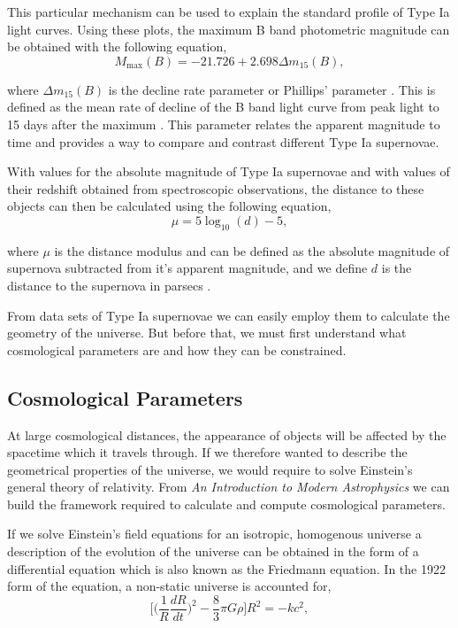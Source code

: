 \documentclass[twocolumn]{revtex4}
\begin{document}
This particular mechanism can be used to explain the standard profile of Type Ia light curves. Using these plots, the maximum B band photometric magnitude can be obtained with the following equation,
\begin{equation}
M_{\max}(B)=-21.726+2.698\Delta m_{15}(B),
\end{equation}

where $\Delta m_{15}(B)$ is the decline rate parameter or Phillips' parameter \cite{high_en_astro}. This is defined as the mean rate of decline of the B band light curve from peak light to 15 days after the maximum \cite{abs_phil}. This parameter relates the apparent magnitude to time and provides a way to compare and contrast different Type Ia supernovae. 

With values for the absolute magnitude of Type Ia supernovae and with values of their redshift obtained from spectroscopic observations, the distance to these objects can then be calculated using the following equation, 
\begin{equation}
\mu = 5 \log_{10}(d) - 5,
\end{equation}

where $\mu$ is the distance modulus and can be defined as the absolute magnitude of supernova subtracted from it's apparent magnitude, and we define $d$ is the distance to the supernova in parsecs \cite{mod_ast}. 

From data sets of Type Ia supernovae we can easily employ them to calculate the geometry of the universe. But before that, we must first understand what cosmological parameters are and how they can be constrained.

\vspace{-3ex}
\subsection{Cosmological Parameters}
\vspace{-2ex}
At large cosmological distances, the appearance of objects will be affected by the spacetime which it travels through. If we therefore wanted to describe the geometrical properties of the universe, we would require to solve Einstein's general theory of relativity. From \textit{An Introduction to Modern Astrophysics} \cite{mod_ast} we can build the framework required to calculate and compute cosmological parameters. 

If we solve Einstein's field equations for an isotropic, homogenous universe a description of the evolution of the universe can be obtained in the form of a differential equation which is also known as the Friedmann equation. In the 1922 form of the equation, a non-static universe is accounted for,
\begin{equation}
\Big[ \Big( \frac{1}{R} \frac{dR}{dt} \Big)^2 - \frac{8}{3} \pi G \rho \Big] R^2 = -k c^2,
\label{eqn:1922_friedmann}
\end{equation}
\end{document}
